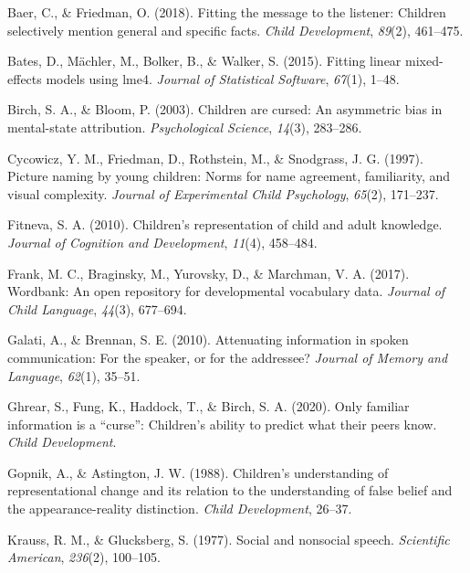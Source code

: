 \documentclass[10pt, letterpaper]{article}
\newenvironment{CSLReferences}%
  {}%
  {\par}
\begin{document}
\hypertarget{refs}{}
\begin{CSLReferences}{1}{0}
\leavevmode\hypertarget{ref-baer2018}{}%
Baer, C., \& Friedman, O. (2018). Fitting the message to the listener:
Children selectively mention general and specific facts. \emph{Child
Development}, \emph{89}(2), 461--475.

\leavevmode\hypertarget{ref-bates2015}{}%
Bates, D., Mächler, M., Bolker, B., \& Walker, S. (2015). Fitting linear
mixed-effects models using {lme4}. \emph{Journal of Statistical
Software}, \emph{67}(1), 1--48.

\leavevmode\hypertarget{ref-birch2003}{}%
Birch, S. A., \& Bloom, P. (2003). Children are cursed: An asymmetric
bias in mental-state attribution. \emph{Psychological Science},
\emph{14}(3), 283--286.

\leavevmode\hypertarget{ref-cycowicz1997}{}%
Cycowicz, Y. M., Friedman, D., Rothstein, M., \& Snodgrass, J. G.
(1997). Picture naming by young children: Norms for name agreement,
familiarity, and visual complexity. \emph{Journal of Experimental Child
Psychology}, \emph{65}(2), 171--237.

\leavevmode\hypertarget{ref-fitneva2010}{}%
Fitneva, S. A. (2010). Children's representation of child and adult
knowledge. \emph{Journal of Cognition and Development}, \emph{11}(4),
458--484.

\leavevmode\hypertarget{ref-frank2017}{}%
Frank, M. C., Braginsky, M., Yurovsky, D., \& Marchman, V. A. (2017).
Wordbank: An open repository for developmental vocabulary data.
\emph{Journal of Child Language}, \emph{44}(3), 677--694.

\leavevmode\hypertarget{ref-galati2010}{}%
Galati, A., \& Brennan, S. E. (2010). Attenuating information in spoken
communication: For the speaker, or for the addressee? \emph{Journal of
Memory and Language}, \emph{62}(1), 35--51.

\leavevmode\hypertarget{ref-ghrear2020}{}%
Ghrear, S., Fung, K., Haddock, T., \& Birch, S. A. (2020). Only familiar
information is a {``curse''}: Children's ability to predict what their
peers know. \emph{Child Development}.

\leavevmode\hypertarget{ref-gopnik1988}{}%
Gopnik, A., \& Astington, J. W. (1988). Children's understanding of
representational change and its relation to the understanding of false
belief and the appearance-reality distinction. \emph{Child Development},
26--37.

\leavevmode\hypertarget{ref-krauss1977}{}%
Krauss, R. M., \& Glucksberg, S. (1977). Social and nonsocial speech.
\emph{Scientific American}, \emph{236}(2), 100--105.


\end{CSLReferences}
\end{document}

